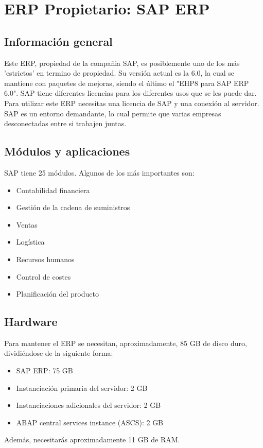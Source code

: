 \documentclass[openany,overnay,a4paper, twoside, 12pt]{book}
\begin{document}
\section{ERP Propietario: SAP ERP}
\subsection{Información general}
Este ERP, propiedad de la compañia SAP, es posiblemente uno de los más 'estrictos' en termino de propiedad. Su versión actual es la 6.0, la cual se mantiene con paquetes de mejoras, siendo el último el "EHP8 para SAP ERP 6.0". SAP tiene diferentes licencias para los diferentes usos que se les puede dar. Para utilizar este ERP necesitas una licencia de SAP y una conexión al servidor. \\
SAP es un entorno demandante, lo cual permite que varias empresas desconectadas entre si trabajen juntas. 
\subsection{Módulos y aplicaciones}
SAP tiene 25 módulos. Algunos de los más importantes son: 
\begin{itemize}
    \item Contabilidad financiera
    \item Gestión de la cadena de suministros
    \item Ventas
    \item Logística
    \item Recursos humanos
    \item Control de costes
    \item Planificación del producto
\end{itemize}
\subsection{Hardware} 
Para mantener el ERP se necesitan, aproximadamente, 85 GB de disco duro, dividiéndose de la siguiente forma: 
\begin{itemize}
    \item SAP ERP: 75 GB
    \item Instanciación primaria del servidor: 2 GB
    \item Instanciaciones adicionales del servidor: 2 GB
    \item ABAP central services instance (ASCS): 2 GB
\end{itemize}
Además, necesitarás aproximadamente 11 GB de RAM. 
\end{document}
